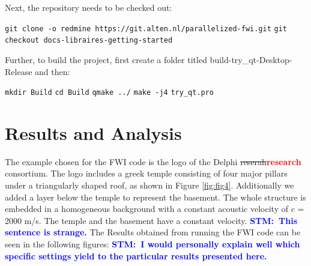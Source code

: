\documentclass[10pt,a4paper]{article}
\newcommand{\commentstm}[1]{\textcolor{blue}{\textbf{STM:\ #1}}}
\newcommand{\newstm}[1]{\textcolor{red}{\textbf{#1}}}
\newcommand{\oldstm}[1]{\sout{#1}}
\begin{document}
Next, the repository needs to be checked out:
\newline

\texttt{git clone -o redmine https://git.alten.nl/parallelized-fwi.git}
\newline
\texttt{git checkout docs-libraires-getting-started}
\newline

Further, to build the project, first create a folder titled build-try\_qt-Desktop-Release and then:
\newline

\texttt{mkdir Build}
\newline
\texttt{cd Build}
\newline
\texttt{qmake ../}
\newline
\texttt{make -j4}
\newline
\texttt{try\_qt.pro}

\section{Results and Analysis}

The example chosen for the FWI code is the logo of the Delphi \oldstm{reserah}\newstm{research} consortium. The logo includes a greek temple consisting of four major
pillars under a triangularly shaped roof, as shown in Figure \ref{fig:fig4}.
Additionally we added a layer below the temple to represent the basement. The whole structure is embedded in a homogeneous background with a constant acoustic velocity of c = 2000 m/s. The temple and the basement have a constant velocity.
\commentstm{This sentence is strange.}
The Results obtained from running the FWI code can be seen in the following figures:
\commentstm{I would personally explain well which specific settings yield to the particular results presented here.}
\end{document}
